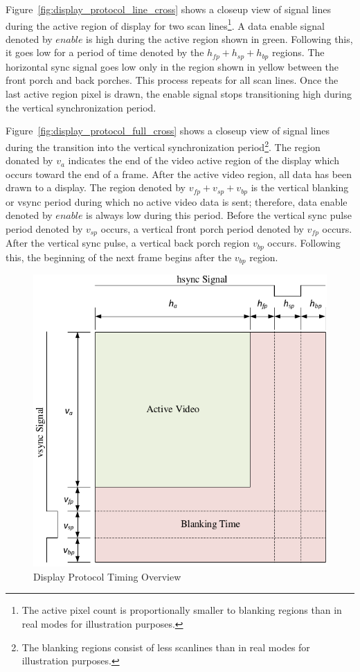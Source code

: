     Figure~\ref{fig:display_protocol_line_cross} shows a closeup view of signal lines during the active region of display for two scan lines\footnote{The active pixel count is proportionally smaller to blanking regions than in real modes for illustration purposes.}. A data enable signal denoted by $enable$ is high during the active region shown in green. Following this, it goes low for a period of time denoted by the $h_{fp}+h_{sp}+h_{bp}$ regions. The horizontal sync signal goes low only in the region shown in yellow between the front porch and back porches. This process repeats for all scan lines. Once the last active region pixel is drawn, the enable signal stops transitioning high during the vertical synchronization period.

    Figure~\ref{fig:display_protocol_full_cross} shows a closeup view of signal lines during the transition into the vertical synchronization period\footnote{The blanking regions consist of less scanlines than in real modes for illustration purposes.}. The region donated by $v_a$ indicates the end of the video active region of the display which occurs toward the end of a frame. After the active video region, all data has been drawn to a display. The region denoted by $v_{fp}+v_{sp}+v_{bp}$ is the vertical blanking or vsync period during which no active video data is sent; therefore, data enable denoted by $enable$ is always low during this period. Before the vertical sync pulse period denoted by $v_{sp}$ occurs, a vertical front porch period denoted by $v_{fp}$ occurs. After the vertical sync pulse, a vertical back porch region $v_{bp}$ occurs. Following this, the beginning of the next frame begins after the $v_{bp}$ region.

    \begin{figure}[H]
        \centering
        \includegraphics[width=1.0\textwidth]{fig/display_timing_overview.pdf}
        \caption{Display Protocol Timing Overview}
        \label{fig:display_protocol_timing_overview}
    \end{figure}

